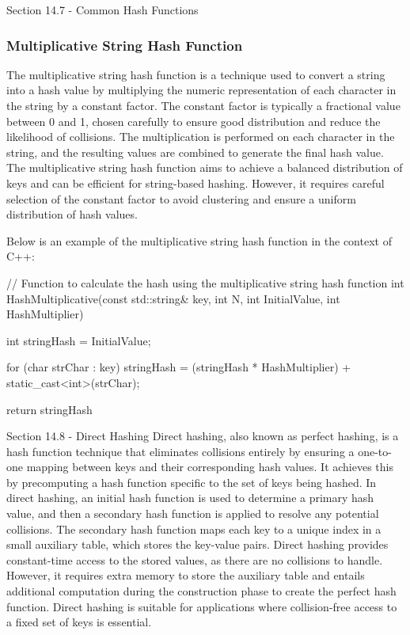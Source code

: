 \begin{notes}{Section 14.7 - Common Hash Functions}
    \subsubsection*{Multiplicative String Hash Function}
    
    The multiplicative string hash function is a technique used to convert a string into a hash value by multiplying the numeric representation of each character in the string by a constant factor. The constant factor 
    is typically a fractional value between 0 and 1, chosen carefully to ensure good distribution and reduce the likelihood of collisions. The multiplication is performed on each character in the string, and the resulting 
    values are combined to generate the final hash value. The multiplicative string hash function aims to achieve a balanced distribution of keys and can be efficient for string-based hashing. However, it requires careful 
    selection of the constant factor to avoid clustering and ensure a uniform distribution of hash values.
    
    \begin{highlight}
        Below is an example of the multiplicative string hash function in the context of C++:
    
    \begin{code}[C++]
    // Function to calculate the hash using the multiplicative string hash function
    int HashMultiplicative(const std::string& key, int N, 
                            int InitialValue, int HashMultiplier) {
        int stringHash = InitialValue;
    
        for (char strChar : key) {
            stringHash = (stringHash * HashMultiplier) + static_cast<int>(strChar);
        }
    
        return stringHash %
    }
    \end{code}
    \end{highlight}
\end{notes}

\begin{notes}{Section 14.8 - Direct Hashing}
    Direct hashing, also known as perfect hashing, is a hash function technique that eliminates collisions entirely by ensuring a one-to-one mapping between keys and their corresponding hash values. It achieves this by 
    precomputing a hash function specific to the set of keys being hashed. In direct hashing, an initial hash function is used to determine a primary hash value, and then a secondary hash function is applied to resolve 
    any potential collisions. The secondary hash function maps each key to a unique index in a small auxiliary table, which stores the key-value pairs. Direct hashing provides constant-time access to the stored values, 
    as there are no collisions to handle. However, it requires extra memory to store the auxiliary table and entails additional computation during the construction phase to create the perfect hash function. Direct hashing 
    is suitable for applications where collision-free access to a fixed set of keys is essential.
\end{notes}

